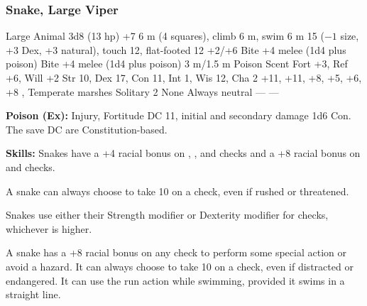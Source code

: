 \subsubsection{Snake, Large Viper}
\begin{MonsterStats}
{Large Animal}
{3d8 (13 hp)}
{+7}
{6 m (4 squares), climb 6 m, swim 6 m}
{15 ($-1$ size, +3 Dex, +3 natural), touch 12, flat-footed 12}
{+2/+6}
{Bite +4 melee (1d4 plus poison)}
{Bite +4 melee (1d4 plus poison)}
{3 m/1.5 m}
{Poison}
{Scent}
{Fort +3, Ref +6, Will +2}
{Str 10, Dex 17, Con 11, Int 1, Wis 12, Cha 2}
{ +11,  +11,  +8,  +5,  +6,  +8}
{, }
{Temperate marshes}
{Solitary}
{2}
{None}
{Always neutral}
{---}
{---}
\end{MonsterStats}

\textbf{Poison (Ex):} Injury, Fortitude DC 11, initial and secondary damage 1d6 Con. The save DC are Constitution-based.

\textbf{Skills:} Snakes have a +4 racial bonus on , , and  checks and a +8 racial bonus on  and  checks.

A snake can always choose to take 10 on a  check, even if rushed or threatened.

Snakes use either their Strength modifier or Dexterity modifier for  checks, whichever is higher.

A snake has a +8 racial bonus on any  check to perform some special action or avoid a hazard. It can always choose to take 10 on a  check, even if distracted or endangered. It can use the run action while swimming, provided it swims in a straight line.
